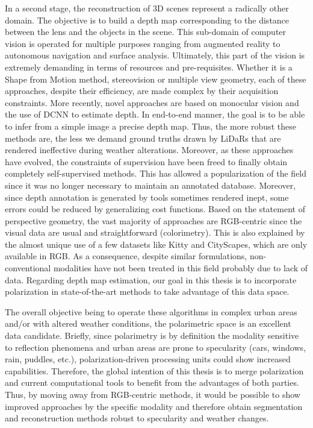 In a second stage, the reconstruction of 3D scenes represent a radically other domain. The objective is to build a depth map corresponding to the distance between the lens and the objects in the scene. This sub-domain of computer vision is operated for multiple purposes ranging from augmented reality to autonomous navigation and surface analysis. 
Ultimately, this part of the vision is extremely demanding in terms of resources and pre-requisites. Whether it is a Shape from Motion method, stereovision or multiple view geometry, each of these approaches, despite their efficiency, are made complex by their acquisition constraints.
More recently, novel approaches are based on monocular vision and the use of DCNN to estimate depth. In end-to-end manner, the goal is to be able to infer from a simple image a precise depth map. Thus, the more robust these methods are, the less we demand ground truths drawn by LiDaRs that are rendered ineffective during weather alterations. Moreover, as these approaches have evolved, the constraints of supervision have been freed to finally obtain completely self-supervised methods. This has allowed a popularization of the field since it was no longer necessary to maintain an annotated database. Moreover, since depth annotation is generated by tools sometimes rendered inept, some errors could be reduced by generalizing cost functions.
Based on the statement of perspective geometry, the vast majority of approaches are RGB-centric since the visual data are usual and straightforward (colorimetry). This is also explained by the almost unique use of a few datasets like Kitty and CityScapes, which are only available in RGB.
As a consequence, despite similar formulations, non-conventional modalities have not been treated in this field probably due to lack of data. 
Regarding depth map estimation, our goal in this thesis is to incorporate polarization in state-of-the-art methods to take advantage of this data space. 

The overall objective being to operate these algorithms in complex urban areas and/or with altered weather conditions, the polarimetric space is an excellent data candidate. Briefly, since polarimetry is by definition the modality sensitive to reflection phenomena and urban areas are prone to specularity (cars, windows, rain, puddles, etc.), polarization-driven processing units could show increased capabilities.
Therefore, the global intention of this thesis is to merge polarization and current computational tools to benefit from the advantages of both parties. Thus, by moving away from RGB-centric methods, it would be possible to show improved approaches by the specific modality and therefore obtain segmentation and reconstruction methods robust to specularity and weather changes.


